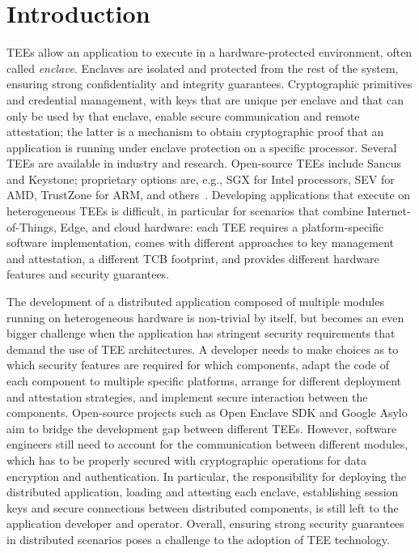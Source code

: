 \section{Introduction}
\label{sec:intro}

\acp{TEE} allow an application to execute in a hardware-protected environment,
often called \emph{enclave}. Enclaves are isolated and protected from the rest
of the system, ensuring strong confidentiality and integrity guarantees.
Cryptographic primitives and credential management, with keys that are unique
per enclave and that can only be used by that enclave, enable secure
communication and remote attestation; the latter is a mechanism to obtain
cryptographic proof that an application is running under enclave protection on a
specific processor.
%
Several \acp{TEE} are available in industry and research. Open-source \acp{TEE}
include Sancus and Keystone; proprietary options are, e.g., \ac{SGX} for Intel
processors, \ac{SEV} for AMD, TrustZone for ARM, and
others~\cite{maene:hardware}. Developing applications that execute on
heterogeneous \acp{TEE} is difficult, in particular for scenarios that combine
Internet-of-Things, Edge, and cloud hardware: each \ac{TEE} requires a
platform-specific software implementation, comes with different approaches to
key management and attestation, a different \ac{TCB} footprint, and provides
different hardware features and security guarantees.

The development of a distributed application composed of multiple modules
running on heterogeneous hardware is non-trivial by itself, but becomes an even
bigger challenge when the application has stringent security requirements that
demand the use of \ac{TEE} architectures. A developer needs to make choices as
to which security features are required for which components, adapt the code of
each component to multiple specific platforms, arrange for different deployment
and attestation strategies, and implement secure interaction between the
components. Open-source projects such as Open Enclave SDK and Google Asylo aim
to bridge the development gap between different \acp{TEE}.  However, software
engineers still need to account for the communication between different modules,
which has to be properly secured with cryptographic operations for data
encryption and authentication.  In particular, the responsibility for deploying
the distributed application, loading and attesting each enclave, establishing
session keys and secure connections between distributed components, is still
left to the application developer and operator. Overall, ensuring strong
security guarantees in distributed scenarios poses a challenge to the adoption
of \ac{TEE} technology.

